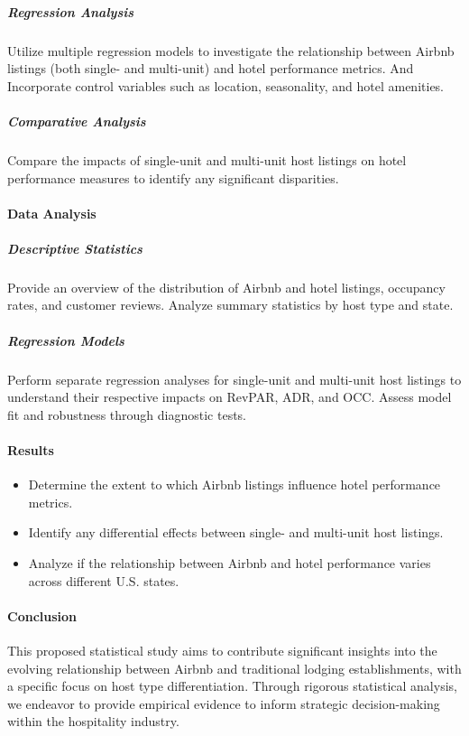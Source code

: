 \documentclass[12pt]{article}
\begin{document}
\subparagraph{Regression Analysis}
Utilize multiple regression models to investigate the relationship between Airbnb listings (both single- and multi-unit) and hotel performance metrics. And Incorporate control variables such as location, seasonality, and hotel amenities.

\subparagraph {Comparative Analysis}
Compare the impacts of single-unit and multi-unit host listings on hotel performance measures to identify any significant disparities.

\paragraph {Data Analysis}

\subparagraph{Descriptive Statistics}

Provide an overview of the distribution of Airbnb and hotel listings, occupancy rates, and customer reviews.
Analyze summary statistics by host type and state.

\subparagraph{Regression Models}

Perform separate regression analyses for single-unit and multi-unit host listings to understand their respective impacts on RevPAR, ADR, and OCC.
Assess model fit and robustness through diagnostic tests.


\paragraph{Results}

\begin{itemize}

\item Determine the extent to which Airbnb listings influence hotel performance metrics.
\item Identify any differential effects between single- and multi-unit host listings.
\item Analyze if the relationship between Airbnb and hotel performance varies across different U.S. states.

\end{itemize}

\paragraph{Conclusion}

This proposed statistical study aims to contribute significant insights into the evolving relationship between Airbnb and traditional lodging establishments, with a specific focus on host type differentiation. Through rigorous statistical analysis, we endeavor to provide empirical evidence to inform strategic decision-making within the hospitality industry.



\end{document}
